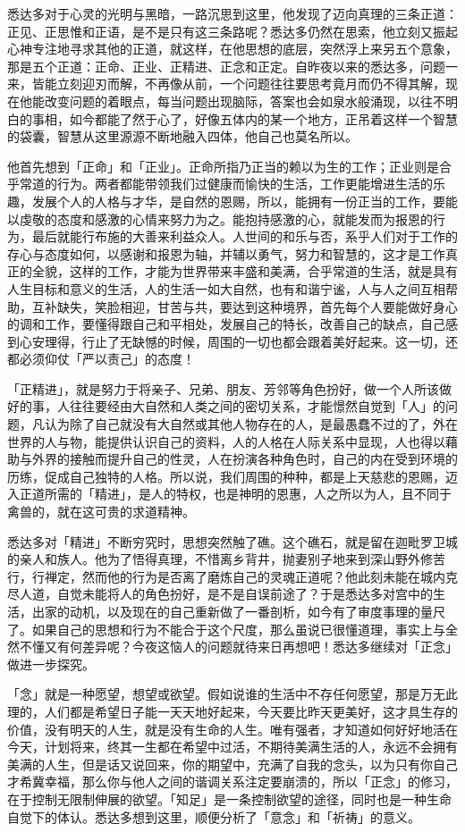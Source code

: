 \documentclass[12pt,twoside,openany]{book}
\begin{document}
悉达多对于心灵的光明与黑暗，一路沉思到这里，他发现了迈向真理的三条正道：正见、正思惟和正语，是不是只有这三条路呢？悉达多仍然在思索，他立刻又振起心神专注地寻求其他的正道，就这样，在他思想的底层，突然浮上来另五个意象，那是五个正道：正命、正业、正精进、正念和正定。自昨夜以来的悉达多，问题一来，皆能立刻迎刃而解，不再像从前，一个问题往往要思考竟月而仍不得其解，现在他能改变问题的着眼点，每当问题出现脑际，答案也会如泉水般涌现，以往不明白的事相，如今都能了然于心了，好像五体内的某一个地方，正吊着这样一个智慧的袋囊，智慧从这里源源不断地融入四体，他自己也莫名所以。

他首先想到「正命」和「正业」。正命所指乃正当的赖以为生的工作；正业则是合乎常道的行为。两者都能带领我们过健康而愉快的生活，工作更能增进生活的乐趣，发展个人的人格与才华，是自然的恩赐，所以，能拥有一份正当的工作，要能以虔敬的态度和感激的心情来努力为之。能抱持感激的心，就能发而为报恩的行为，最后就能行布施的大善来利益众人。人世间的和乐与否，系乎人们对于工作的存心与态度如何，以感谢和报恩为轴，并辅以勇气，努力和智慧的，这才是工作真正的全貌，这样的工作，才能为世界带来丰盛和美满，合乎常道的生活，就是具有人生目标和意义的生活，人的生活一如大自然，也有和谐宁谧，人与人之间互相帮助，互补缺失，笑脸相迎，甘苦与共，要达到这种境界，首先每个人要能做好身心的调和工作，要懂得跟自己和平相处，发展自己的特长，改善自己的缺点，自己感到心安理得，行止了无缺憾的时候，周围的一切也都会跟着美好起来。这一切，还都必须仰仗「严以责己」的态度！

「正精进」，就是努力于将亲子、兄弟、朋友、芳邻等角色扮好，做一个人所该做好的事，人往往要经由大自然和人类之间的密切关系，才能憬然自觉到「人」的问题，凡认为除了自己就没有大自然或其他人物存在的人，是最愚蠢不过的了，外在世界的人与物，能提供认识自己的资料，人的人格在人际关系中显现，人也得以藉助与外界的接触而提升自己的性灵，人在扮演各种角色时，自己的内在受到环境的历练，促成自己独特的人格。所以说，我们周围的种种，都是上天慈悲的恩赐，迈入正道所需的「精进」，是人的特权，也是神明的恩惠，人之所以为人，且不同于禽兽的，就在这可贵的求道精神。

悉达多对「精进」不断穷究时，思想突然触了礁。这个礁石，就是留在迦毗罗卫城的亲人和族人。他为了悟得真理，不惜离乡背井，抛妻别子地来到深山野外修苦行，行禅定，然而他的行为是否离了磨炼自己的灵魂正道呢？他此刻未能在城内克尽人道，自觉未能将人的角色扮好，是不是自误前途了？于是悉达多对宫中的生活，出家的动机，以及现在的自己重新做了一番剖析，如今有了审度事理的量尺了。如果自己的思想和行为不能合于这个尺度，那么虽说已很懂道理，事实上与全然不懂又有何差异呢？今夜这恼人的问题就待来日再想吧！悉达多继续对「正念」做进一步探究。

「念」就是一种愿望，想望或欲望。假如说谁的生活中不存任何愿望，那是万无此理的，人们都是希望日子能一天天地好起来，今天要比昨天更美好，这才具生存的价值，没有明天的人生，就是没有生命的人生。唯有强者，才知道如何好好地活在今天，计划将来，终其一生都在希望中过活，不期待美满生活的人，永远不会拥有美满的人生，但是话又说回来，你的期望中，充满了自我的念头，以为只有你自己才希冀幸福，那么你与他人之间的谐调关系注定要崩溃的，所以「正念」的修习，在于控制无限制伸展的欲望。「知足」是一条控制欲望的途径，同时也是一种生命自觉下的体认。悉达多想到这里，顺便分析了「意念」和「祈祷」的意义。
\end{document}
